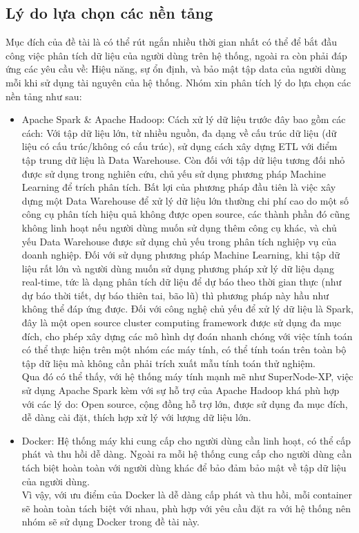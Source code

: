 \documentclass[11pt,a4paper]{article}
\begin{document}
\subsection{Lý do lựa chọn các nền tảng}
Mục đích của đề tài là có thể rút ngắn nhiều thời gian nhất có thể để bắt đầu công việc phân tích dữ liệu của người dùng trên hệ thống, ngoài ra còn phải đáp ứng các yêu cầu về: Hiệu năng, sự ổn định, và bảo mật tập data của người dùng mỗi khi sử dụng tài nguyên của hệ thống. Nhóm xin phân tích lý do lựa chọn các nền tảng như sau:
\begin{itemize}
    \item Apache Spark\cite{SPARK_WIKI} \& Apache Hadoop\cite{HADOOP_WIKI}: Cách xử lý dữ liệu trước đây bao gồm các cách: Với tập dữ liệu lớn, từ nhiều nguồn, đa dạng về cấu trúc dữ liệu (dữ liệu có cấu trúc/không có cấu trúc), sử dụng cách xây dựng ETL với điểm tập trung dữ liệu là Data Warehouse. Còn đối với tập dữ liệu tương đối nhỏ được sử dụng trong nghiên cứu, chủ yếu sử dụng phương pháp Machine Learning để trích phân tích. Bất lợi của phương pháp đầu tiên là việc xây dựng một Data Warehouse để xử lý dữ liệu lớn thường chi phí cao do một số công cụ phân tích hiệu quả không được open source, các thành phần đó cũng không linh hoạt nếu người dùng muốn sử dụng thêm công cụ khác, và chủ yếu Data Warehouse được sử dụng chủ yếu trong phân tích nghiệp vụ của doanh nghiệp. Đối với sử dụng phương pháp Machine Learning, khi tập dữ liệu rất lớn và người dùng muốn sử dụng phương pháp xử lý dữ liệu dạng real-time, tức là dạng phân tích dữ liệu để dự báo theo thời gian thực (như dự báo thời tiết, dự báo thiên tai, bão lũ) thì phương pháp này hầu như không thể đáp ứng được. Đối với công nghệ chủ yếu để xử lý dữ liệu là Spark, đây là một open source cluster computing  framework được sử dụng đa mục đích, cho phép xây dựng các mô hình dự đoán nhanh chóng với việc tính toán có thể thực hiện trên một nhóm các máy tính, có thể tính toán trên toàn bộ tập dữ liệu mà không cần phải trích xuất mẫu tính toán thử nghiệm.\\
    Qua đó có thể thấy, với hệ thống máy tính mạnh mẽ như SuperNode-XP, việc sử dụng Apache Spark kèm với sự hỗ trợ của Apache Hadoop khá phù hợp với các lý do: Open source, cộng đồng hỗ trợ lớn, được sử dụng đa mục đích, dễ dàng cài đặt, thích hợp xử lý với lượng dữ liệu lớn.
    \item Docker: Hệ thống máy khi cung cấp cho người dùng cần linh hoạt, có thể cấp phát và thu hồi dễ dàng. Ngoài ra mỗi hệ thống cung cấp cho người dùng cần tách biệt hoàn toàn với người dùng khác để bảo đảm bảo mật về tập dữ liệu của người dùng.\\
    Vì vậy, với ưu điểm của Docker là dễ dàng cấp phát và thu hồi, mỗi container sẽ hoàn toàn tách biệt với nhau, phù hợp với yêu cầu đặt ra với hệ thống nên nhóm sẽ sử dụng Docker trong đề tài này.
\end{itemize}
\end{document}
